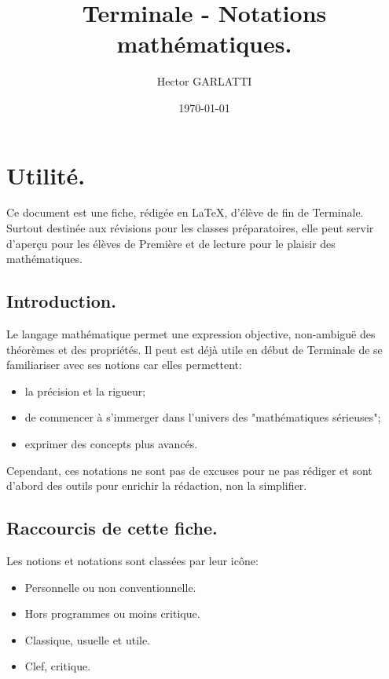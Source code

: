 \documentclass[12pt]{article}
\title{Terminale - Notations mathématiques.}
\author{Hector GARLATTI}
\date{\today{}}
\begin{document}
\maketitle

\section{Utilité.}
Ce document est une fiche, rédigée en \LaTeX, d'élève de fin de Terminale. 
Surtout destinée aux révisions pour les classes préparatoires, 
elle peut servir d'aperçu pour les élèves de Première et de lecture pour
le plaisir des mathématiques.

\subsection{Introduction.}
Le langage mathématique permet une expression objective, non-ambiguë
des théorèmes et des propriétés. Il peut est déjà utile en début
de Terminale de se familiariser avec ses notions car elles permettent:
\begin{itemize}
    \item la précision et la rigueur;
    \item de commencer à s'immerger dans l'univers
    des "mathématiques sérieuses";
    \item exprimer des concepts plus avancés.
\end{itemize}

Cependant, ces notations ne sont pas de excuses pour ne pas rédiger
et sont d'abord des outils pour enrichir la rédaction, non la simplifier.

\subsection{Raccourcis de cette fiche.}
Les notions et notations sont classées par leur icône:
\begin{itemize}
    \item[\In] Personnelle ou non conventionnelle.
    \item[\Il] Hors programmes ou moins critique.
    \item[\Ia] Classique, usuelle et utile.
    \item[\Ii] Clef, critique. 
\end{itemize}
\end{document}
